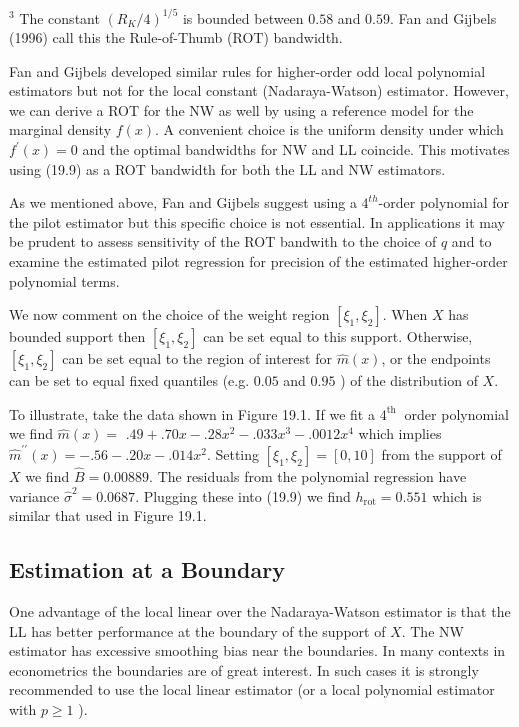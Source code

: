 \documentclass[10pt]{article}
\begin{document}
${ }^{3}$ The constant $\left(R_{K} / 4\right)^{1 / 5}$ is bounded between $0.58$ and $0.59$. Fan and Gijbels (1996) call this the Rule-of-Thumb (ROT) bandwidth.

Fan and Gijbels developed similar rules for higher-order odd local polynomial estimators but not for the local constant (Nadaraya-Watson) estimator. However, we can derive a ROT for the NW as well by using a reference model for the marginal density $f(x)$. A convenient choice is the uniform density under which $f^{\prime}(x)=0$ and the optimal bandwidths for NW and LL coincide. This motivates using (19.9) as a ROT bandwidth for both the LL and NW estimators.

As we mentioned above, Fan and Gijbels suggest using a $4^{t h}$-order polynomial for the pilot estimator but this specific choice is not essential. In applications it may be prudent to assess sensitivity of the ROT bandwith to the choice of $q$ and to examine the estimated pilot regression for precision of the estimated higher-order polynomial terms.

We now comment on the choice of the weight region $\left[\xi_{1}, \xi_{2}\right]$. When $X$ has bounded support then $\left[\xi_{1}, \xi_{2}\right]$ can be set equal to this support. Otherwise, $\left[\xi_{1}, \xi_{2}\right]$ can be set equal to the region of interest for $\widehat{m}(x)$, or the endpoints can be set to equal fixed quantiles (e.g. $0.05$ and $0.95$ ) of the distribution of $X$.

To illustrate, take the data shown in Figure 19.1. If we fit a $4^{\text {th }}$ order polynomial we find $\widehat{m}(x)=$ $.49+.70 x-.28 x^{2}-.033 x^{3}-.0012 x^{4}$ which implies $\widehat{m}^{\prime \prime}(x)=-.56-.20 x-.014 x^{2}$. Setting $\left[\xi_{1}, \xi_{2}\right]=[0,10]$ from the support of $X$ we find $\widehat{B}=0.00889$. The residuals from the polynomial regression have variance $\widehat{\sigma}^{2}=0.0687$. Plugging these into (19.9) we find $h_{\mathrm{rot}}=0.551$ which is similar that used in Figure 19.1.

\subsection{Estimation at a Boundary}
One advantage of the local linear over the Nadaraya-Watson estimator is that the LL has better performance at the boundary of the support of $X$. The NW estimator has excessive smoothing bias near the boundaries. In many contexts in econometrics the boundaries are of great interest. In such cases it is strongly recommended to use the local linear estimator (or a local polynomial estimator with $p \geq 1$ ).
\end{document}

